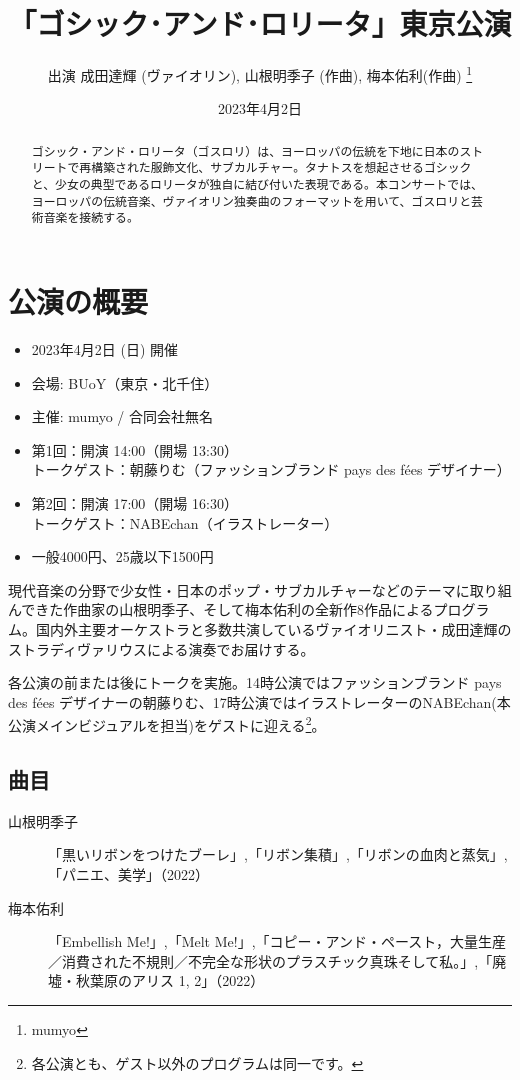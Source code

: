 \documentclass[a4paper, twoside]{ltjsarticle}
\title{「ゴシック･アンド･ロリータ」東京公演 }
\author{ 出演 成田達輝 (ヴァイオリン), 山根明季子 (作曲), 梅本佑利(作曲) \thanks{mumyo} }
\date{2023年4月2日}
\begin{document}
\maketitle

\begin{abstract}
ゴシック・アンド・ロリータ（ゴスロリ）は、ヨーロッパの伝統を下地に日本のストリートで再構築された服飾文化、サブカルチャー。タナトスを想起させるゴシックと、少女の典型であるロリータが独自に結び付いた表現である。本コンサートでは、ヨーロッパの伝統音楽、ヴァイオリン独奏曲のフォーマットを用いて、ゴスロリと芸術音楽を接続する。
\end{abstract} 

\section*{公演の概要}
\begin{itemize}
\item 2023年4月2日 (日) 開催 
\item 会場: BUoY（東京・北千住）
\item 主催: mumyo / 合同会社無名
\item 第1回：開演 14:00（開場 13:30）\\
 トークゲスト：朝藤りむ（ファッションブランド pays des fées デザイナー）
\item 第2回：開演 17:00（開場 16:30）\\
 トークゲスト：NABEchan（イラストレーター）　
\item 一般4000円、25歳以下1500円
\end{itemize}

現代音楽の分野で少女性・日本のポップ・サブカルチャーなどのテーマに取り組んできた作曲家の山根明季子、そして梅本佑利の全新作8作品によるプログラム。国内外主要オーケストラと多数共演しているヴァイオリニスト・成田達輝のストラディヴァリウスによる演奏でお届けする。

各公演の前または後にトークを実施。14時公演ではファッションブランド pays des fées デザイナーの朝藤りむ、17時公演ではイラストレーターのNABEchan(本公演メインビジュアルを担当)をゲストに迎える\footnote{ 各公演とも、ゲスト以外のプログラムは同一です。}。

\subsection*{曲目}

\begin{description}
\item[山根明季子]「黒いリボンをつけたブーレ」,「リボン集積」,「リボンの血肉と蒸気」,「パニエ、美学」（2022）
\item[梅本佑利]「Embellish Me!」,「Melt Me!」,「コピー・アンド・ペースト，大量生産／消費された不規則／不完全な形状のプラスチック真珠そして私。」,「廃墟・秋葉原のアリス 1, 2」（2022）
\end{description}
\end{document}

